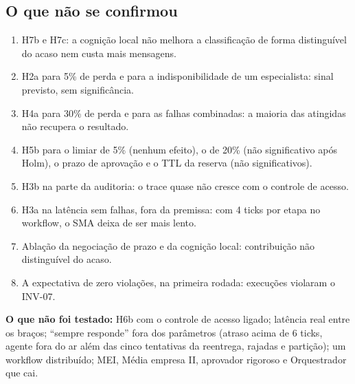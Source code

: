 \documentclass[10pt,a4paper]{article}
\begin{document}
\subsection{O que não se confirmou}
\begin{enumerate}
  \item H7b e H7c: a cognição local não melhora a classificação de forma distinguível do acaso nem custa mais mensagens.
  \item H2a para 5\% de perda e para a indisponibilidade de um especialista: sinal previsto, sem significância.
  \item H4a para 30\% de perda e para as falhas combinadas: a maioria das atingidas não recupera o resultado.
  \item H5b para o limiar de 5\% (nenhum efeito), o de 20\% (não significativo após Holm), o prazo de aprovação e o TTL
        da reserva (não significativos).
  \item H3b na parte da auditoria: o trace quase não cresce com o controle de acesso.
  \item H3a na latência sem falhas, fora da premissa: com 4 ticks por etapa no workflow, o SMA deixa de ser mais lento.
  \item Ablação da negociação de prazo e da cognição local: contribuição não distinguível do acaso.
  \item A expectativa de zero violações, na primeira rodada:  execuções violaram o INV-07.
\end{enumerate}
\textbf{O que não foi testado:} H6b com o controle de acesso ligado; latência real entre os braços; \enquote{sempre
responde} fora dos parâmetros (atraso acima de 6 ticks, agente fora do ar além das cinco tentativas da reentrega,
rajadas e partição); um workflow distribuído; MEI, Média empresa II, aprovador rigoroso e Orquestrador que cai.
\end{document}
